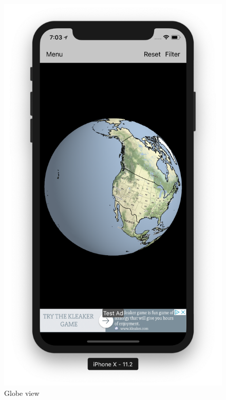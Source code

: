     \begin{figure}[!htb]
        \begin{minipage}{0.5\textwidth}
            \centering
            \includegraphics[width=0.8\linewidth]{figures/ch4/home_globe.png}
            \caption{Globe view}\label{Fig:home_globe}
        \end{minipage}\hfill
        \begin{minipage}{0.5\textwidth}
            \centering

\end{minipage}
\end{figure}
